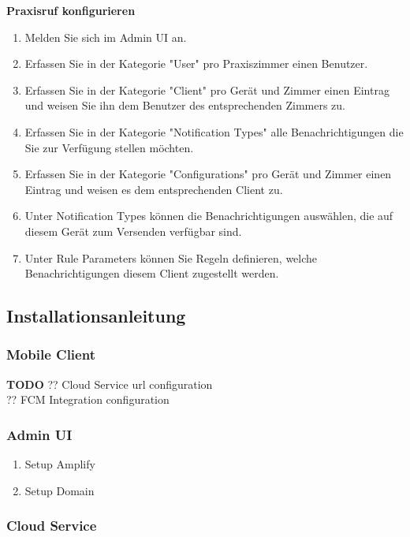         \textbf{Praxisruf konfigurieren}
        \begin{enumerate}
            \item Melden Sie sich im Admin UI an.
            \item Erfassen Sie in der Kategorie "User" pro Praxiszimmer einen Benutzer.
            \item Erfassen Sie in der Kategorie "Client" pro Gerät und Zimmer einen Eintrag und weisen Sie ihn dem Benutzer des entsprechenden Zimmers zu.
            \item Erfassen Sie in der Kategorie "Notification Types" alle Benachrichtigungen die Sie zur Verfügung stellen möchten.
            \item Erfassen Sie in der Kategorie "Configurations" pro Gerät und Zimmer einen Eintrag und weisen es dem entsprechenden Client zu.
            \item Unter Notification Types können die Benachrichtigungen auswählen, die auf diesem Gerät zum Versenden verfügbar sind.
            \item Unter Rule Parameters können Sie Regeln definieren, welche Benachrichtigungen diesem Client zugestellt werden.
        \end{enumerate}

    \subsection{Installationsanleitung}

    \subsubsection*{Mobile Client}
        \textbf{TODO}
        ?? Cloud Service url configuration \\
        ?? FCM Integration configuration \\

    \subsubsection*{Admin UI}
    \begin{enumerate}
        \item Setup Amplify
        \item Setup Domain
    \end{enumerate}

    \subsubsection*{Cloud Service}

